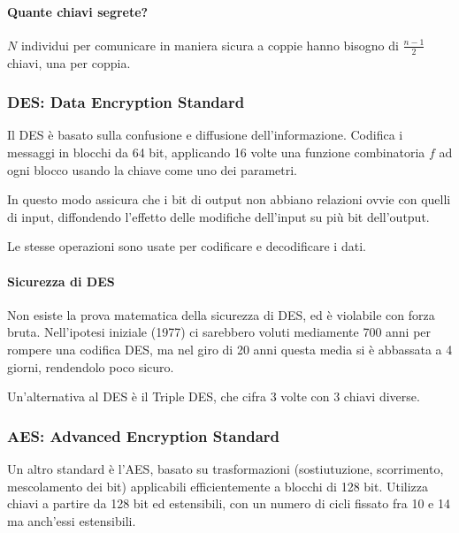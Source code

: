 \paragraph{Quante chiavi segrete?} $N$ individui per comunicare in maniera sicura a coppie hanno bisogno di $\frac{n-1}{2}$ chiavi, una per coppia.

\subsubsection{DES: Data Encryption Standard}
Il DES è basato sulla confusione e diffusione dell'informazione.
Codifica i messaggi in blocchi da 64 bit, applicando 16 volte una funzione combinatoria $f$ ad ogni blocco usando la chiave come uno dei parametri.

In questo modo assicura che i bit di output non abbiano relazioni ovvie con quelli di input, diffondendo l'effetto delle modifiche dell'input su più bit dell'output.

Le stesse operazioni sono usate per codificare e decodificare i dati.

\paragraph{Sicurezza di DES} Non esiste la prova matematica della sicurezza di DES, ed è violabile con forza bruta.
Nell'ipotesi iniziale (1977) ci sarebbero voluti mediamente 700 anni per rompere una codifica DES, ma nel giro di 20 anni questa media si è abbassata a 4 giorni, rendendolo poco sicuro.

Un'alternativa al DES è il Triple DES, che cifra 3 volte con 3 chiavi diverse.

\subsubsection{AES: Advanced Encryption Standard}
Un altro standard è l'AES, basato su trasformazioni (sostiutuzione, scorrimento, mescolamento dei bit) applicabili efficientemente a blocchi di 128 bit.
Utilizza chiavi a partire da 128 bit ed estensibili, con un numero di cicli fissato fra 10 e 14 ma anch'essi estensibili.

